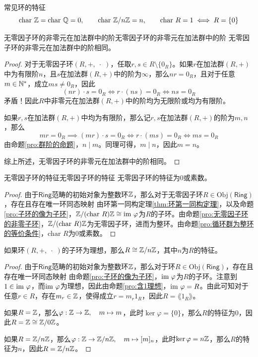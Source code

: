 \begin{proposition}{常见环的特征}
	$$
	\text{char }\mathbb{Z}=\text{char }\mathbb{Q}=0,\qquad 
	\text{char }\mathbb{Z}/n\mathbb{Z}=n,\qquad 
	\text{char }R=1\iff R=\{0\} 
	$$
\end{proposition}

\begin{proposition}{无零因子环的非零元在加法群中的阶}{无零因子环的非零元在加法群中的阶}
	无零因子环的非零元在加法群中的阶相同。
\end{proposition}

\begin{proof}
	对于无零因子环$(R,+,\;\cdot\;)$，任取$r,s\in R\setminus\{0_R\}$。如果$r$在加法群$(R,+)$中为有限阶$n$，且$s$在加法群$(R,+)$中的阶为$\infty$，那么$nr=0_R$，且对于任意$m\in\mathbb{N}^*$，成立$ms\ne 0_R$，因此
	$$
	(nr)\cdot s=0_R\iff 
	r\cdot (ns)=0_R\iff 
	ns=0_R
	$$
	矛盾！因此$R$中非零元在加法群$(R,+)$中的阶均为无限阶或均为有限阶。
	
	如果$r,s$在加法群$(R,+)$中均为有限阶，那么记$r,s$在加法群$(R,+)$的阶为$m,n$，那么
	$$
	mr=0_R\implies
	(mr)\cdot s=0_R\iff
	r\cdot(m s)=0_R\iff
	ms=0_R
	$$
	由命题\ref{pro:群阶的命题}，$n\mid m$。同理可得，$m\mid n$，因此$m=n$。
	
	综上所述，无零因子环的非零元在加法群中的阶相同。
\end{proof}

\begin{proposition}{无零因子环的特征}{无零因子环的特征}
	无零因子环的特征为$0$或素数。
\end{proposition}

\begin{proof}
	由于$\mathsf{Ring}$范畴的初始对象为整数环$\mathbb{Z}$，那么对于无零因子环$R\in \mathrm{Obj}(\mathsf{Ring})$，存在且存在唯一环同态映射
	由环第一同构定理\ref{thm:环第一同构定理}，以及命题\ref{pro:子环的像为子环}，$\mathbb{Z}/(\text{char }R)\mathbb{Z}\cong \text{im } \varphi$为$R$的子环。由命题\ref{pro:无零因子环的非零子环}，$\mathbb{Z}/(\text{char }R)\mathbb{Z}$为无零因子环，进而为整环。由命题\ref{pro:循环群为整环的等价条件}，$\text{char }R$为$0$或素数。
\end{proof}

\begin{proposition}
	如果环$(R,+,\;\cdot\;)$的子环为理想，那么$R\cong \mathbb{Z}/n\mathbb{Z}$，其中$n$为$R$的特征。
\end{proposition}

\begin{proof}
	由于$\mathsf{Ring}$范畴的初始对象为整数环$\mathbb{Z}$，那么对于环$R\in \mathrm{Obj}(\mathsf{Ring})$，存在且存在唯一环同态映射
	由命题\ref{pro:子环的像为子环}，$\text{im } \varphi$为$R$的子环。注意到$1\in\text{im } \varphi$，而$\text{im } \varphi$为理想，因此由命题\ref{pro:含1理想}，$\text{im } \varphi=R$。由此可知对于任意$r\in R$，存在$m_r\in\mathbb{Z}$，使得成立$r=m_r1_R$，因此$R=\lang 1_R\rang$。
	
	如果$R=\mathbb{Z}$，那么$\varphi:\mathbb{Z}\to\mathbb{Z},\quad m\mapsto m$，此时$\ker\varphi=\{ 0 \}$，那么$R$的特征为$0$，因此$R=\mathbb{Z}\cong\mathbb{Z}/0\mathbb{Z}$。
	
	如果$R=\mathbb{Z}/n\mathbb{Z}$，那么$\varphi:\mathbb{Z}\to \mathbb{Z}/n\mathbb{Z},\quad m\mapsto [m]_{n}$，此时$\ker\varphi=n\mathbb{Z}$，那么$R$的特征为$n$，因此$R=\mathbb{Z}/n\mathbb{Z}$。
\end{proof}

